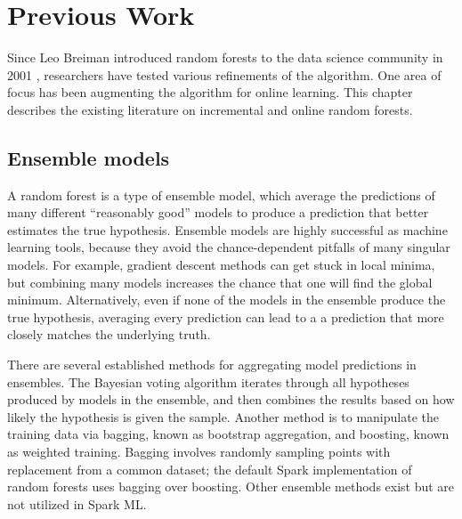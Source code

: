 \chapter{Previous Work} Since Leo Breiman introduced random forests to the data
science community in 2001 \cite{Breiman}, researchers have tested various
refinements of the algorithm. One area of focus has been augmenting the
algorithm for online learning. This chapter describes the existing literature
on incremental and online random forests.

\section{Ensemble models} A random forest is a type of ensemble model, which
average the predictions of many different ``reasonably good'' models to produce
a prediction that better estimates the true hypothesis. Ensemble models are
highly successful as machine learning tools, because they avoid the
chance-dependent pitfalls of many singular models. For example, gradient
descent methods can get stuck in local minima, but combining many models
increases the chance that one will find the global minimum. Alternatively, even
if none of the models in the ensemble  produce the true hypothesis, averaging
every prediction can lead to a a prediction that more closely matches the
underlying truth. \cite{Dietterich}

There are several established methods for aggregating model predictions in
ensembles. The Bayesian voting algorithm iterates through all hypotheses
produced by models in the ensemble, and then combines the results based on how
likely the hypothesis is given the sample. Another method is to manipulate the
training data via bagging, known as bootstrap aggregation, and boosting, known
as weighted training. Bagging involves randomly sampling points with
replacement from a common dataset; the default Spark implementation of random
forests uses bagging over boosting. Other ensemble methods exist but are not
utilized in Spark ML.


